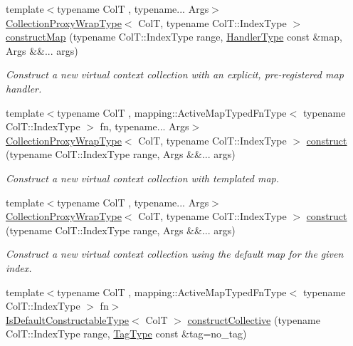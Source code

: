 \begin{DoxyCompactItemize}
{\footnotesize template$<$typename ColT , typename... Args$>$ }\\\hyperlink{structvt_1_1vrt_1_1collection_1_1_collection_manager_a56458ed7f9bb22b631b9b3a745f42f94}{Collection\+Proxy\+Wrap\+Type}$<$ ColT, typename Col\+T\+::\+Index\+Type $>$ \hyperlink{structvt_1_1vrt_1_1collection_1_1_collection_manager_a07aebc3fa25e2fe901eedc5db722655f}{construct\+Map} (typename Col\+T\+::\+Index\+Type range, \hyperlink{namespacevt_af64846b57dfcaf104da3ef6967917573}{Handler\+Type} const \&map, Args \&\&... args)
\begin{DoxyCompactList}\small\item\em Construct a new virtual context collection with an explicit, pre-\/registered map handler. \end{DoxyCompactList}\item 
{\footnotesize template$<$typename ColT , mapping\+::\+Active\+Map\+Typed\+Fn\+Type$<$ typename Col\+T\+::\+Index\+Type $>$ fn, typename... Args$>$ }\\\hyperlink{structvt_1_1vrt_1_1collection_1_1_collection_manager_a56458ed7f9bb22b631b9b3a745f42f94}{Collection\+Proxy\+Wrap\+Type}$<$ ColT, typename Col\+T\+::\+Index\+Type $>$ \hyperlink{structvt_1_1vrt_1_1collection_1_1_collection_manager_a4de84e9efd7a3948e3c20be549441cfd}{construct} (typename Col\+T\+::\+Index\+Type range, Args \&\&... args)
\begin{DoxyCompactList}\small\item\em Construct a new virtual context collection with templated map. \end{DoxyCompactList}\item 
{\footnotesize template$<$typename ColT , typename... Args$>$ }\\\hyperlink{structvt_1_1vrt_1_1collection_1_1_collection_manager_a56458ed7f9bb22b631b9b3a745f42f94}{Collection\+Proxy\+Wrap\+Type}$<$ ColT, typename Col\+T\+::\+Index\+Type $>$ \hyperlink{structvt_1_1vrt_1_1collection_1_1_collection_manager_a9049432725068d7ec7f664f7a8759a69}{construct} (typename Col\+T\+::\+Index\+Type range, Args \&\&... args)
\begin{DoxyCompactList}\small\item\em Construct a new virtual context collection using the default map for the given index. \end{DoxyCompactList}\item 
{\footnotesize template$<$typename ColT , mapping\+::\+Active\+Map\+Typed\+Fn\+Type$<$ typename Col\+T\+::\+Index\+Type $>$ fn$>$ }\\\hyperlink{structvt_1_1vrt_1_1collection_1_1_collection_manager_af8091fcb8218dad155ea028c9b5d283f}{Is\+Default\+Constructable\+Type}$<$ ColT $>$ \hyperlink{structvt_1_1vrt_1_1collection_1_1_collection_manager_aa2531212565b2c6f85fa3b55d278bbba}{construct\+Collective} (typename Col\+T\+::\+Index\+Type range, \hyperlink{namespacevt_a84ab281dae04a52a4b243d6bf62d0e52}{Tag\+Type} const \&tag=no\+\_\+tag)

\end{DoxyCompactItemize}
